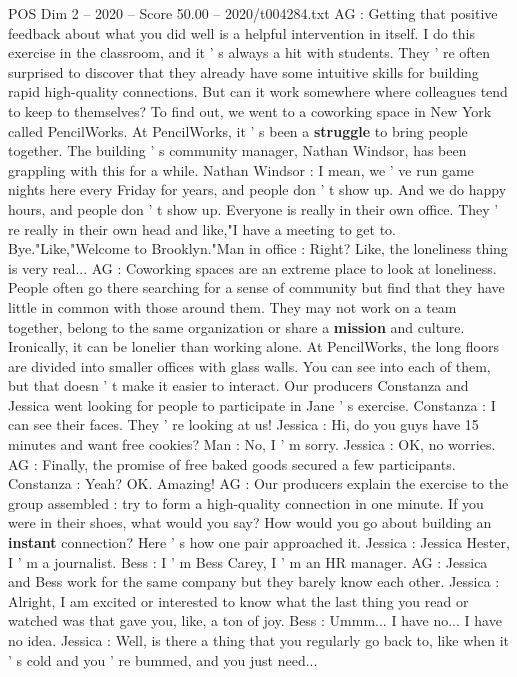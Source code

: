 \begin{textsample}{POS Dim 2 – 2020 – Score 50.00 – 2020/t004284.txt}
AG : Getting that positive feedback about what you did well is a helpful intervention in itself.
I do this exercise in the classroom, and it ' s always a hit with students.
They ' re often surprised to discover that they already have some intuitive skills for building rapid high-quality connections.
But can it work somewhere where colleagues tend to keep to themselves?
To find out, we went to a coworking space in New York called PencilWorks.
At PencilWorks, it ' s been a \textbf{struggle} to bring people together.
The building ' s community manager, Nathan Windsor, has been grappling with this for a while.
Nathan Windsor : I mean, we ' ve run game nights here every Friday for years, and people don ' t show up.
And we do happy hours, and people don ' t show up.
Everyone is really in their own office.
They ' re really in their own head and like,"I have a meeting to get to.
Bye."Like,"Welcome to Brooklyn."Man in office : Right?
Like, the loneliness thing is very real...
AG : Coworking spaces are an extreme place to look at loneliness.
People often go there searching for a sense of community but find that they have little in common with those around them.
They may not work on a team together, belong to the same organization or share a \textbf{mission} and culture.
Ironically, it can be lonelier than working alone.
At PencilWorks, the long floors are divided into smaller offices with glass walls.
You can see into each of them, but that doesn ' t make it easier to interact.
Our producers Constanza and Jessica went looking for people to participate in Jane ' s exercise.
Constanza : I can see their faces.
They ' re looking at us!
Jessica : Hi, do you guys have 15 minutes and want free cookies?
Man : No, I ' m sorry.
Jessica : OK, no worries.
AG : Finally, the promise of free baked goods secured a few participants.
Constanza : Yeah?
OK.
Amazing!
AG : Our producers explain the exercise to the group assembled : try to form a high-quality connection in one minute.
If you were in their shoes, what would you say?
How would you go about building an \textbf{instant} connection?
Here ' s how one pair approached it.
Jessica : Jessica Hester, I ' m a journalist.
Bess : I ' m Bess Carey, I ' m an HR manager.
AG : Jessica and Bess work for the same company but they barely know each other.
Jessica : Alright, I am excited or interested to know what the last thing you read or watched was that gave you, like, a ton of joy.
Bess : Ummm...
I have no...
I have no idea.
Jessica : Well, is there a thing that you regularly go back to, like when it ' s cold and you ' re bummed, and you just need...

\end{textsample}
